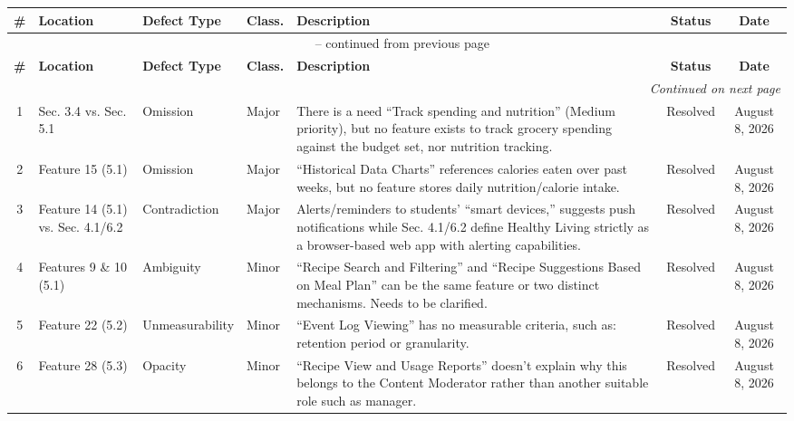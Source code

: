 \documentclass[10pt,letterpaper]{article}
\renewcommand{\arraystretch}{1.3}
\begin{document}
\small
\renewcommand{\arraystretch}{1.3}
\begin{longtable}{|c|p{2.3cm}|p{2cm}|p{1.5cm}|p{4.5cm}|c|c|}
\hline
\textbf{\#} & \textbf{Location} & \textbf{Defect Type} & \textbf{Class.} & \textbf{Description} & \textbf{Status} & \textbf{Date} \\
\hline
\endfirsthead

\multicolumn{7}{c}{\tablename\ \thetable{} -- continued from previous page} \\
\hline
\textbf{\#} & \textbf{Location} & \textbf{Defect Type} & \textbf{Class.} & \textbf{Description} & \textbf{Status} & \textbf{Date} \\
\hline
\endhead

\hline
\multicolumn{7}{r}{\textit{Continued on next page}} \\
\endfoot

\hline
\endlastfoot

1 & Sec. 3.4 vs. Sec. 5.1 & Omission & Major & There is a need ``Track spending and nutrition'' (Medium priority), but no feature exists to track grocery spending against the budget set, nor nutrition tracking. & Resolved & August 8, 2026 \\
\hline

2 & Feature 15 (5.1) & Omission & Major & ``Historical Data Charts'' references calories eaten over past weeks, but no feature stores daily nutrition/calorie intake. & Resolved & August 8, 2026 \\
\hline

3 & Feature 14 (5.1) vs. Sec. 4.1/6.2 & Contradiction & Major & Alerts/reminders to students' ``smart devices,'' suggests push notifications while Sec. 4.1/6.2 define Healthy Living strictly as a browser-based web app with alerting capabilities. & Resolved & August 8, 2026 \\
\hline

4 & Features 9 \& 10 (5.1) & Ambiguity & Minor & ``Recipe Search and Filtering'' and ``Recipe Suggestions Based on Meal Plan'' can be  the same feature or two distinct mechanisms. Needs to be clarified. & Resolved & August 8, 2026 \\
\hline

5 & Feature 22 (5.2) & Unmeasurability & Minor & ``Event Log Viewing'' has no measurable criteria, such as: retention period or granularity. & Resolved & August 8, 2026 \\
\hline

6 & Feature 28 (5.3) & Opacity & Minor & ``Recipe View and Usage Reports'' doesn't explain why this belongs to the Content Moderator rather than another suitable role such as manager. & Resolved & August 8, 2026 \\
\hline


\end{longtable}
\end{document}
